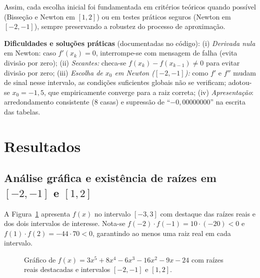 \documentclass[12pt,a4paper]{article}
\begin{document}
Assim, cada escolha inicial foi fundamentada em critérios teóricos quando possível (Bisseção e Newton em $[1,2]$) ou em testes práticos seguros (Newton em $[-2,-1]$), sempre preservando a robustez do processo de aproximação.

\textbf{Dificuldades e soluções práticas} (documentadas no código):
(i) \emph{Derivada nula} em Newton: caso $f'(x_k)=0$, interrompe-se com mensagem de falha (evita divisão por zero);
(ii) \emph{Secantes:} checa-se $f(x_k)-f(x_{k-1})\neq 0$ para evitar divisão por zero; 
(iii) \emph{Escolha de $x_0$ em Newton ($[-2,-1]$):} como $f'$ e $f''$ mudam de sinal nesse intervalo, as condições suficientes globais não se verificam; adotou-se $x_0=-1{,}5$, que empiricamente converge para a raiz correta;
(iv) \emph{Apresentação}: arredondamento consistente (8 casas) e supressão de “$-0{,}00000000$” na escrita das tabelas.

\section{Resultados}
\subsection{Análise gráfica e existência de raízes em $[-2,-1]$ e $[1,2]$}
A Figura~\ref{fig:grafico} apresenta $f(x)$ no intervalo $[-3,3]$ com destaque das raízes reais e dos dois intervalos de interesse.
Nota-se $f(-2)\cdot f(-1)=10\cdot(-20)<0$ e $f(1)\cdot f(2)=-44\cdot 70<0$, garantindo ao menos uma raiz real em cada intervalo.

\begin{figure}[H]
\centering
{}
\caption{Gráfico de $f(x)=3x^{5}+8x^{4}-6x^{3}-16x^{2}-9x-24$ com raízes reais destacadas e intervalos $[-2,-1]$ e $[1,2]$.}
\label{fig:grafico}
\end{figure}
\end{document}
